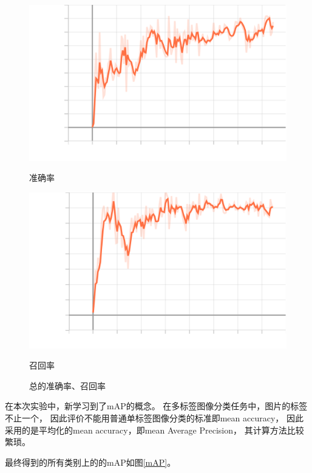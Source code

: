 \documentclass{article}
\begin{document}
\begin{figure}[H]
    \begin{minipage}[H]{0.5\linewidth}
        \centering
        \includegraphics[width=\textwidth]{figures/metrics_precision.png}
        \caption{准确率}
    \end{minipage}
    \begin{minipage}[H]{0.5\linewidth}
        \centering
        \includegraphics[width=\textwidth]{figures/metrics_recall.png}
        \caption{召回率}
    \end{minipage}
    \label{PandR-sum}
    \caption{总的准确率、召回率}
\end{figure}

在本次实验中，新学习到了mAP的概念。
在多标签图像分类任务中，图片的标签不止一个，
因此评价不能用普通单标签图像分类的标准即mean accuracy，
因此采用的是平均化的mean accuracy，即mean Average Precision，
其计算方法比较繁琐。

最终得到的所有类别上的的mAP如图\ref{mAP}。
\end{document}
